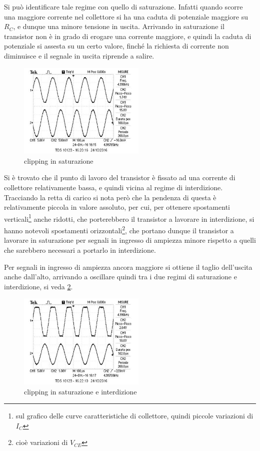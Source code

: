 \documentclass[10pt,a4paper]{article}
\begin{document}
Si può identificare tale regime con quello di saturazione. Infatti quando scorre una maggiore corrente nel collettore si ha una caduta di potenziale maggiore su $R_C$, e dunque una minore tensione in uscita. Arrivando in saturazione il transistor non è in grado di erogare una corrente maggiore, e quindi la caduta di potenziale si assesta su un certo valore, finché la richiesta di corrente non diminuisce e il segnale in uscita riprende a salire.

\begin{figure}[h!]
	\centering
	\includegraphics[width=0.54\textwidth]{../oscilloscopio/firstclipbasso.jpg}
	\caption{clipping in saturazione}
	\label{fig:clipping}
\end{figure}

Si è trovato che il punto di lavoro del transistor è fissato ad una corrente di collettore relativamente bassa, e quindi vicina al regime di interdizione. Tracciando la retta di carico si nota però che la pendenza di questa è relativamente piccola in valore assoluto, per cui, per ottenere spostamenti verticali\footnote{sul grafico delle curve caratteristiche di collettore, quindi piccole variazioni di $I_C$} anche ridotti, che porterebbero il transistor a lavorare in interdizione, si hanno notevoli spostamenti orizzontali\footnote{cioè variazioni di $V_{CE}$}, che portano dunque il transistor a lavorare in saturazione per segnali in ingresso di ampiezza minore rispetto a quelli che sarebbero necessari a portarlo in interdizione.

Per segnali in ingresso di ampiezza ancora maggiore si ottiene il taglio dell'uscita anche dall'alto, arrivando a oscillare quindi tra i due regimi di saturazione e interdizione, si veda \figurename{\ref{fig:clippingdoppio}}.

\begin{figure}[h!]
	\centering
	\includegraphics[width=0.54\textwidth]{../oscilloscopio/clipall.jpg}
	\caption{clipping in saturazione e interdizione}
	\label{fig:clippingdoppio}
\end{figure}
\end{document}

